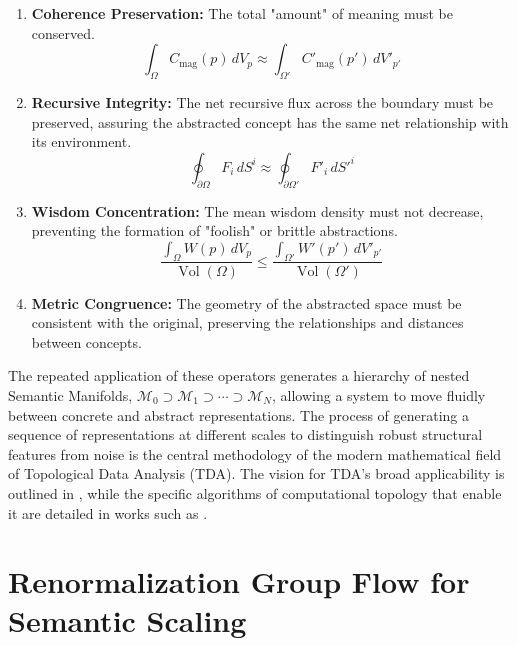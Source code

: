 \begin{enumerate}
    \item \textbf{Coherence Preservation:} The total "amount" of meaning must be conserved.
    \begin{equation}
    \int_{\Omega} C_{\text{mag}}(p) \, dV_p \approx \int_{\Omega'} C'_{\text{mag}}(p') \, dV'_{p'}
    \end{equation}
    \item \textbf{Recursive Integrity:} The net recursive flux across the boundary must be preserved, assuring the abstracted concept has the same net relationship with its environment.
    \begin{equation}
    \oint_{\partial \Omega} F_i \, dS^i \approx \oint_{\partial \Omega'} F'_i \, dS'^i
    \end{equation}
    \item \textbf{Wisdom Concentration:} The mean wisdom density must not decrease, preventing the formation of "foolish" or brittle abstractions.
    \begin{equation}
    \frac{\int_{\Omega} W(p) \, dV_p}{\operatorname{Vol}(\Omega)} \leq \frac{\int_{\Omega'} W'(p') \, dV'_{p'}}{\operatorname{Vol}(\Omega')}
    \end{equation}
    \item \textbf{Metric Congruence:} The geometry of the abstracted space must be consistent with the original, preserving the relationships and distances between concepts.
\end{enumerate}

The repeated application of these operators generates a hierarchy of nested Semantic Manifolds, \(\mathcal{M}_0 \supset \mathcal{M}_1 \supset \cdots \supset \mathcal{M}_N\), allowing a system to move fluidly between concrete and abstract representations. The process of generating a sequence of representations at different scales to distinguish robust structural features from noise is the central methodology of the modern mathematical field of Topological Data Analysis (TDA). The vision for TDA's broad applicability is outlined in \textcite{Carlsson2009}, while the specific algorithms of computational topology that enable it are detailed in works such as \textcite{EdelsbrunnerHarer2010}.


\section{Renormalization Group Flow for Semantic Scaling}

